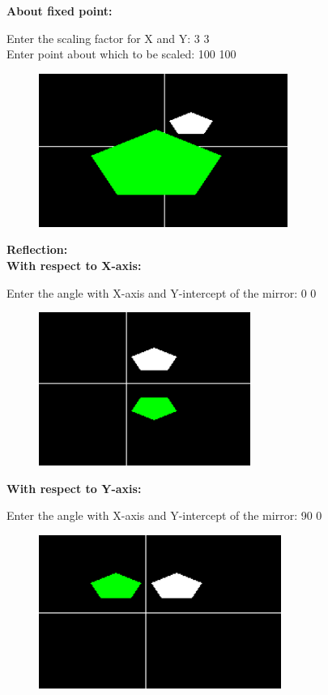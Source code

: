 \documentclass[9pt,letterpaper]{article}
\begin{document}
\newpage
\textbf{About fixed point:}

Enter the scaling factor for X and Y: 3 3\\
Enter point about which to be scaled: 100 100

\begin{figure}[h]
    \centering
    \includegraphics[height=5cm]{Outputs/OP7.png}
\end{figure}

\newpage
\textbf{\large{Reflection: }}\\
\textbf{With respect to X-axis:}

Enter the angle with X-axis and Y-intercept of the mirror: 0 0

\begin{figure}[h]
    \centering
    \includegraphics[height=5cm]{Outputs/OP8.png}
\end{figure}

\textbf{With respect to Y-axis:}

Enter the angle with X-axis and Y-intercept of the mirror: 90 0

\begin{figure}[h]
    \centering
    \includegraphics[height=5cm]{Outputs/OP9.png}
\end{figure}
\end{document}
